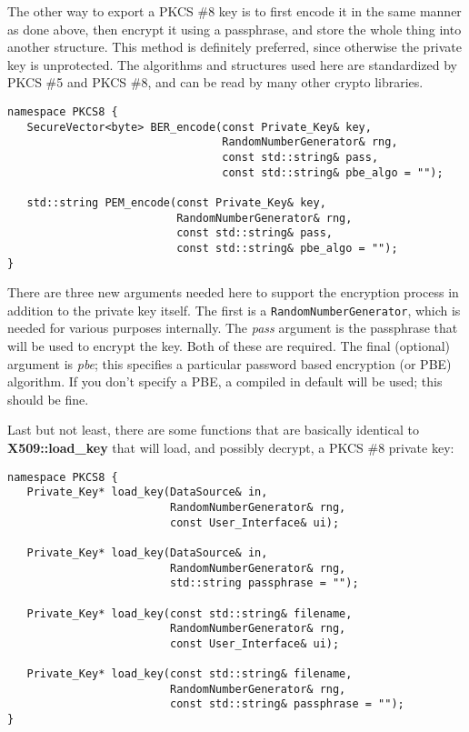 \documentclass{article}
\newcommand{\function}[1]{\textbf{#1}}
\newcommand{\type}[1]{\texttt{#1}}
\renewcommand{\arg}[1]{\textsl{#1}}
\begin{document}
The other way to export a PKCS \#8 key is to first encode it in the
same manner as done above, then encrypt it using a passphrase, and
store the whole thing into another structure. This method is
definitely preferred, since otherwise the private key is
unprotected. The algorithms and structures used here are standardized
by PKCS \#5 and PKCS \#8, and can be read by many other crypto
libraries.

\begin{verbatim}
namespace PKCS8 {
   SecureVector<byte> BER_encode(const Private_Key& key,
                                 RandomNumberGenerator& rng,
                                 const std::string& pass,
                                 const std::string& pbe_algo = "");

   std::string PEM_encode(const Private_Key& key,
                          RandomNumberGenerator& rng,
                          const std::string& pass,
                          const std::string& pbe_algo = "");
}
\end{verbatim}

There are three new arguments needed here to support the encryption
process in addition to the private key itself. The first is a
\type{RandomNumberGenerator}, which is needed for various purposes
internally. The \arg{pass} argument is the passphrase that will be
used to encrypt the key. Both of these are required. The final
(optional) argument is \arg{pbe}; this specifies a particular password
based encryption (or PBE) algorithm. If you don't specify a PBE,
a compiled in default will be used; this should be fine.

Last but not least, there are some functions that are basically
identical to \function{X509::load\_key} that will load, and possibly
decrypt, a PKCS \#8 private key:

\begin{verbatim}
namespace PKCS8 {
   Private_Key* load_key(DataSource& in,
                         RandomNumberGenerator& rng,
                         const User_Interface& ui);

   Private_Key* load_key(DataSource& in,
                         RandomNumberGenerator& rng,
                         std::string passphrase = "");

   Private_Key* load_key(const std::string& filename,
                         RandomNumberGenerator& rng,
                         const User_Interface& ui);

   Private_Key* load_key(const std::string& filename,
                         RandomNumberGenerator& rng,
                         const std::string& passphrase = "");
}
\end{verbatim}
\end{document}

